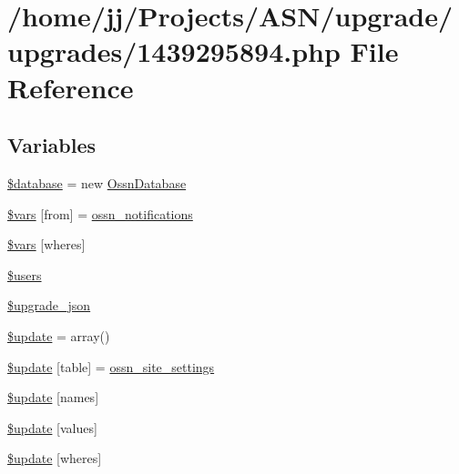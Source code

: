 \hypertarget{1439295894_8php}{}\section{/home/jj/\+Projects/\+A\+S\+N/upgrade/upgrades/1439295894.php File Reference}
\label{1439295894_8php}
\subsection*{Variables}
\begin{DoxyCompactItemize}
\item 
\hyperlink{1439295894_8php_a7691c0162d89de0b6ba47edcd8ba8878}{\$database} = new \hyperlink{class_ossn_database}{Ossn\+Database}
\item 
\hyperlink{1439295894_8php_a69d928c2a2126dc7d4207f81d8a4c3b5}{\$vars} \mbox{[}\textquotesingle{}from\textquotesingle{}\mbox{]} = \textquotesingle{}\hyperlink{_ossn_notifications_2ossn__com_8php_ab2b4e6857fa4ab775e70e28fa8daa4e8}{ossn\+\_\+notifications}\textquotesingle{}
\item 
\hyperlink{1439295894_8php_ad23f13346da18e35b613d04e669dc292}{\$vars} \mbox{[}\textquotesingle{}wheres\textquotesingle{}\mbox{]}
\item 
\hyperlink{1439295894_8php_a28005d22fa7ef2dfe215ad886b497d9c}{\$users}
\item 
\hyperlink{1439295894_8php_a512525d0f5eb608ac72ca7b85e5fbf65}{\$upgrade\+\_\+json}
\item 
\hyperlink{1439295894_8php_a13a7db07df65d01cfbca768f443084cc}{\$update} = array()
\item 
\hyperlink{1439295894_8php_aee7ba5985ddf023a93862ab77e9718f9}{\$update} \mbox{[}\textquotesingle{}table\textquotesingle{}\mbox{]} = \textquotesingle{}\hyperlink{ossn_8lib_8system_8php_a610e2045b8a86c09f777b4d82e24e34c}{ossn\+\_\+site\+\_\+settings}\textquotesingle{}
\item 
\hyperlink{1439295894_8php_abcf5ad2e4fef35de04bef0168cc91ddc}{\$update} \mbox{[}\textquotesingle{}names\textquotesingle{}\mbox{]}
\item 
\hyperlink{1439295894_8php_ac82a75b4c6df37380ff77c88f041785e}{\$update} \mbox{[}\textquotesingle{}values\textquotesingle{}\mbox{]}
\item 
\hyperlink{1439295894_8php_aacde4479a904b32d0f24dea4e01f148c}{\$update} \mbox{[}\textquotesingle{}wheres\textquotesingle{}\mbox{]}
\item 

\end{DoxyCompactItemize}
